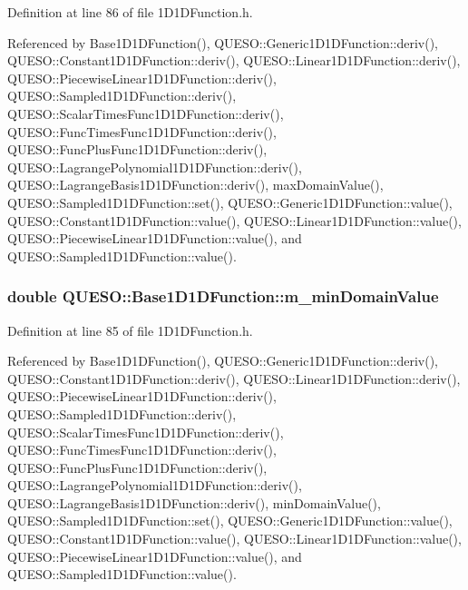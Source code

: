 Definition at line 86 of file 1\-D1\-D\-Function.\-h.



Referenced by Base1\-D1\-D\-Function(), Q\-U\-E\-S\-O\-::\-Generic1\-D1\-D\-Function\-::deriv(), Q\-U\-E\-S\-O\-::\-Constant1\-D1\-D\-Function\-::deriv(), Q\-U\-E\-S\-O\-::\-Linear1\-D1\-D\-Function\-::deriv(), Q\-U\-E\-S\-O\-::\-Piecewise\-Linear1\-D1\-D\-Function\-::deriv(), Q\-U\-E\-S\-O\-::\-Sampled1\-D1\-D\-Function\-::deriv(), Q\-U\-E\-S\-O\-::\-Scalar\-Times\-Func1\-D1\-D\-Function\-::deriv(), Q\-U\-E\-S\-O\-::\-Func\-Times\-Func1\-D1\-D\-Function\-::deriv(), Q\-U\-E\-S\-O\-::\-Func\-Plus\-Func1\-D1\-D\-Function\-::deriv(), Q\-U\-E\-S\-O\-::\-Lagrange\-Polynomial1\-D1\-D\-Function\-::deriv(), Q\-U\-E\-S\-O\-::\-Lagrange\-Basis1\-D1\-D\-Function\-::deriv(), max\-Domain\-Value(), Q\-U\-E\-S\-O\-::\-Sampled1\-D1\-D\-Function\-::set(), Q\-U\-E\-S\-O\-::\-Generic1\-D1\-D\-Function\-::value(), Q\-U\-E\-S\-O\-::\-Constant1\-D1\-D\-Function\-::value(), Q\-U\-E\-S\-O\-::\-Linear1\-D1\-D\-Function\-::value(), Q\-U\-E\-S\-O\-::\-Piecewise\-Linear1\-D1\-D\-Function\-::value(), and Q\-U\-E\-S\-O\-::\-Sampled1\-D1\-D\-Function\-::value().

\hypertarget{class_q_u_e_s_o_1_1_base1_d1_d_function_a7b18b3854ee74ef5befbc67b75ebbdc5}{
\subsubsection[{m\-\_\-min\-Domain\-Value}]{\setlength{\rightskip}{0pt plus 5cm}double Q\-U\-E\-S\-O\-::\-Base1\-D1\-D\-Function\-::m\-\_\-min\-Domain\-Value\hspace{0.3cm}{\ttfamily [protected]}}}\label{class_q_u_e_s_o_1_1_base1_d1_d_function_a7b18b3854ee74ef5befbc67b75ebbdc5}


Definition at line 85 of file 1\-D1\-D\-Function.\-h.



Referenced by Base1\-D1\-D\-Function(), Q\-U\-E\-S\-O\-::\-Generic1\-D1\-D\-Function\-::deriv(), Q\-U\-E\-S\-O\-::\-Constant1\-D1\-D\-Function\-::deriv(), Q\-U\-E\-S\-O\-::\-Linear1\-D1\-D\-Function\-::deriv(), Q\-U\-E\-S\-O\-::\-Piecewise\-Linear1\-D1\-D\-Function\-::deriv(), Q\-U\-E\-S\-O\-::\-Sampled1\-D1\-D\-Function\-::deriv(), Q\-U\-E\-S\-O\-::\-Scalar\-Times\-Func1\-D1\-D\-Function\-::deriv(), Q\-U\-E\-S\-O\-::\-Func\-Times\-Func1\-D1\-D\-Function\-::deriv(), Q\-U\-E\-S\-O\-::\-Func\-Plus\-Func1\-D1\-D\-Function\-::deriv(), Q\-U\-E\-S\-O\-::\-Lagrange\-Polynomial1\-D1\-D\-Function\-::deriv(), Q\-U\-E\-S\-O\-::\-Lagrange\-Basis1\-D1\-D\-Function\-::deriv(), min\-Domain\-Value(), Q\-U\-E\-S\-O\-::\-Sampled1\-D1\-D\-Function\-::set(), Q\-U\-E\-S\-O\-::\-Generic1\-D1\-D\-Function\-::value(), Q\-U\-E\-S\-O\-::\-Constant1\-D1\-D\-Function\-::value(), Q\-U\-E\-S\-O\-::\-Linear1\-D1\-D\-Function\-::value(), Q\-U\-E\-S\-O\-::\-Piecewise\-Linear1\-D1\-D\-Function\-::value(), and Q\-U\-E\-S\-O\-::\-Sampled1\-D1\-D\-Function\-::value().



